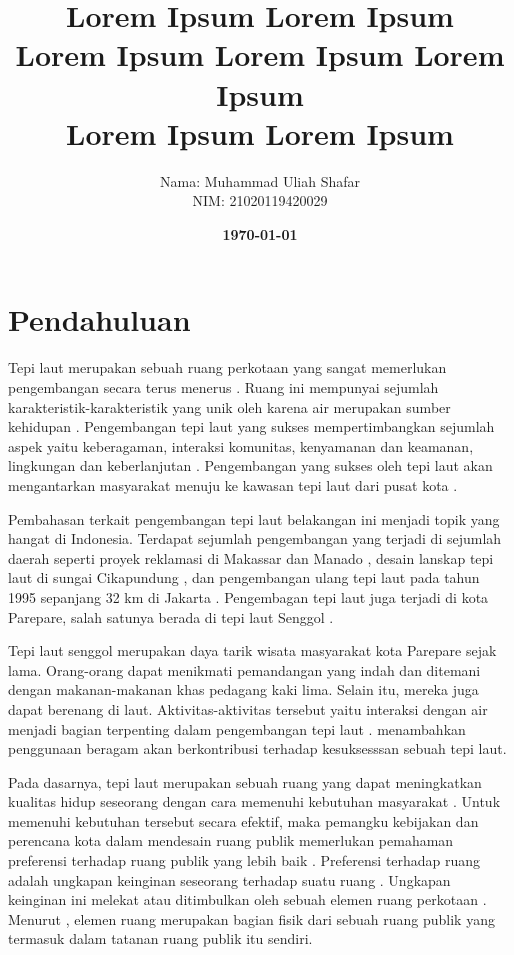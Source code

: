 \documentclass[11pt]{udthesis} %
\title{
\textbf{Lorem Ipsum Lorem Ipsum \\
Lorem Ipsum Lorem Ipsum Lorem Ipsum} \\
\textbf{{Lorem Ipsum Lorem Ipsum \\}}
} %
\date{\textbf{\today}}
\author{
\begin{tabular}{@{}ll@{}}
	Nama & : Muhammad Uliah Shafar\\
	NIM & : 21020119420029\\
\end{tabular}
}
\begin{document}
\section{Pendahuluan}

Tepi laut merupakan sebuah ruang perkotaan yang sangat memerlukan pengembangan secara terus menerus \citep{shamsuddin2013}. Ruang ini mempunyai sejumlah karakteristik-karakteristik yang unik oleh karena air merupakan sumber kehidupan \citep{yassin2010}. Pengembangan tepi laut yang sukses mempertimbangkan sejumlah aspek yaitu keberagaman, interaksi komunitas, kenyamanan dan keamanan, lingkungan dan keberlanjutan \citep{hussein2014}. Pengembangan yang sukses oleh tepi laut akan mengantarkan masyarakat menuju ke kawasan tepi laut dari pusat kota \citep{hoyle2001}.

Pembahasan terkait pengembangan tepi laut belakangan ini menjadi topik yang hangat di Indonesia. Terdapat sejumlah pengembangan yang terjadi di sejumlah daerah seperti proyek reklamasi di Makassar dan Manado \citep{andi2017,fhuh2017,tungka2012}, desain lanskap tepi laut di sungai Cikapundung \citep{ainy2016}, dan pengembangan ulang tepi laut pada tahun 1995 sepanjang 32 km di Jakarta \citep{pramesti2017}. 
Pengembagan tepi laut juga terjadi di kota Parepare, salah satunya berada di tepi laut Senggol \citep{tri2020}.

Tepi laut senggol merupakan daya tarik wisata masyarakat kota Parepare sejak lama. Orang-orang dapat menikmati pemandangan yang indah dan ditemani dengan makanan-makanan khas pedagang kaki lima. Selain itu, mereka juga dapat berenang di laut. Aktivitas-aktivitas tersebut yaitu interaksi dengan air menjadi bagian terpenting dalam pengembangan tepi laut \citep{davidowich1998}. \cite{eldeeb2015} menambahkan penggunaan beragam akan berkontribusi terhadap kesuksesssan sebuah tepi laut.

Pada dasarnya, tepi laut merupakan sebuah ruang yang dapat meningkatkan kualitas hidup seseorang dengan cara memenuhi kebutuhan masyarakat \citep{kim2012}.
Untuk memenuhi kebutuhan tersebut secara efektif, maka pemangku kebijakan dan perencana kota dalam mendesain ruang publik memerlukan pemahaman preferensi terhadap ruang publik yang lebih baik \citep{madureira2018}.
Preferensi terhadap ruang adalah ungkapan keinginan seseorang terhadap suatu ruang \citep{zhang2006}. Ungkapan keinginan ini melekat atau ditimbulkan oleh sebuah elemen ruang perkotaan \citep{knox2014}. Menurut \cite{alves2008}, elemen ruang merupakan bagian fisik dari sebuah ruang publik yang termasuk dalam tatanan ruang publik itu sendiri.
\end{document}
